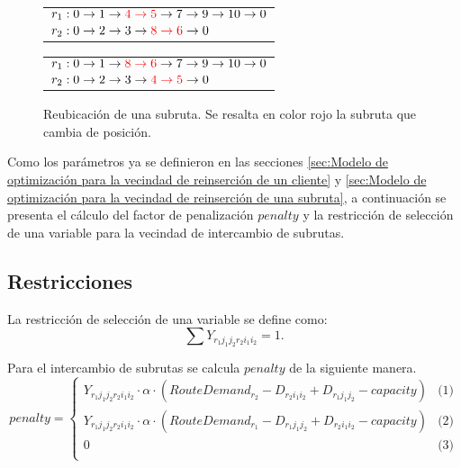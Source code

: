 \documentclass[12pt]{report}
\begin{document}
		\begin{figure}[h!]
		\centering
		\begin{minipage}{0.45\textwidth}
			\begin{tabular}{l}
				$r_1:  0 \rightarrow 1\rightarrow \textcolor{red}{4 \rightarrow 5} \rightarrow 7 \rightarrow 9 \rightarrow 10 \rightarrow  0$\\
				$r_2:  0\rightarrow 2\rightarrow 3\rightarrow \textcolor{red}{8 \rightarrow 6} \rightarrow  0$\\
			\end{tabular}
		\end{minipage}
		\hfill
		\begin{minipage}{0.45\textwidth}
			\begin{tabular}{l}
				$r_1:  0 \rightarrow 1\rightarrow  \textcolor{red}{8 \rightarrow 6} \rightarrow 7 \rightarrow 9 \rightarrow 10 \rightarrow  0$\\
				$r_2:  0\rightarrow 2\rightarrow 3\rightarrow \textcolor{red}{4 \rightarrow 5} \rightarrow  0$\\
			\end{tabular}
		\end{minipage}

		\caption{Reubicación de una subruta. Se resalta en color rojo la subruta que cambia de posición.}
		\label{variable-3}
	\end{figure}

	Como los parámetros ya se definieron en las secciones \ref{sec:Modelo de optimización para la vecindad de reinserción de un cliente} y \ref{sec:Modelo de optimización para la vecindad de reinserción de una subruta}, a continuación se presenta el cálculo del factor de penalización $penalty$ y la restricción de selección de una variable para la vecindad de intercambio de subrutas.

	\subsection{Restricciones}

	La restricción de selección de una variable se define como:
	\[
	\sum  Y_{r_1j_1j_2r_2i_1i_2} = 1.
	\]

	Para el intercambio de subrutas se calcula $penalty$ de la siguiente manera.
	\[ 			penalty =
	\begin{cases}
		Y_{r_1j_1j_2r_2i_1i_2} \cdot \alpha \cdot (RouteDemand_{r_2} - D_{r_2i_1i_2} + D_{r_1j_1j_2} - capacity) & \text{(1)} \\
		Y_{r_1j_1j_2r_2i_1i_2} \cdot \alpha \cdot (RouteDemand_{r_1} - D_{r_1j_1j_2} + D_{r_2i_1i_2} - capacity) & \text{(2)} \\
		0 & \text{(3)}\\
	\end{cases} \]
\end{document}

